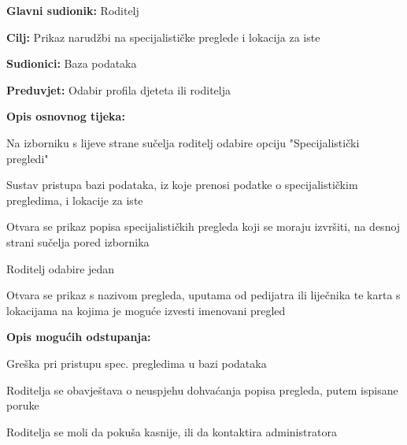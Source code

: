 					\noindent {}
					\begin{packed_item}
						
						\item \textbf{Glavni sudionik: }Roditelj
						\item  \textbf{Cilj:} Prikaz narudžbi na specijalističke preglede i lokacija za iste
						\item  \textbf{Sudionici:} Baza podataka
						\item  \textbf{Preduvjet:} Odabir profila djeteta ili roditelja
						\item  \textbf{Opis osnovnog tijeka:}
						
						\item[] \begin{packed_enum}
							
							\item Na izborniku s lijeve strane sučelja roditelj odabire opciju "Specijalistički pregledi"
							\item Sustav pristupa bazi podataka, iz koje prenosi podatke o specijalističkim pregledima, i lokacije za iste
							\item Otvara se prikaz popisa specijalističkih pregleda koji se moraju izvršiti, na desnoj strani sučelja pored izbornika
							\item Roditelj odabire jedan
							\item Otvara se prikaz s nazivom pregleda, uputama od pedijatra ili liječnika te karta s lokacijama na kojima je moguće izvesti imenovani pregled 
						\end{packed_enum}
						\item  \textbf{Opis mogućih odstupanja:}
						\item[] \begin{packed_item}
							
							\item[2.a] Greška pri pristupu spec. pregledima u bazi podataka
							\item[] \begin{packed_enum}
								
								\item Roditelja se obavještava o neuspjehu dohvaćanja popisa pregleda, putem ispisane poruke
								\item Roditelja se moli da pokuša kasnije, ili da kontaktira administratora
								
							\end{packed_enum}
						\end{packed_item}
					\end{packed_item}
					
